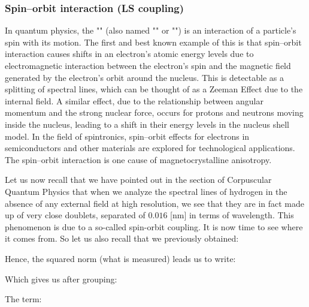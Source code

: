 	\subsubsection{Spin–orbit interaction (LS coupling)}\label{ls coupling}
	In quantum physics, the "" (also named ""  or "") is an interaction of a particle's spin with its motion. The first and best known example of this is that spin–orbit interaction causes shifts in an electron's atomic energy levels due to electromagnetic interaction between the electron's spin and the magnetic field generated by the electron's orbit around the nucleus. This is detectable as a splitting of spectral lines, which can be thought of as a Zeeman Effect due to the internal field. A similar effect, due to the relationship between angular momentum and the strong nuclear force, occurs for protons and neutrons moving inside the nucleus, leading to a shift in their energy levels in the nucleus shell model. In the field of spintronics, spin–orbit effects for electrons in semiconductors and other materials are explored for technological applications. The spin–orbit interaction is one cause of magnetocrystalline anisotropy.
	
	Let us now recall that we have pointed out in the section of Corpuscular Quantum Physics that when we analyze the spectral lines of hydrogen in the absence of any external field at high resolution, we see that they are in fact made up of very close doublets, separated of $0.016$ [nm] in terms of wavelength. This phenomenon is due to a so-called spin-orbit coupling. It is now time to see where it comes from. So let us also recall that we previously obtained:
	
	Hence, the squared norm (what is measured) leads us to write:
	
	Which gives us after grouping:
	
	The term:
	
